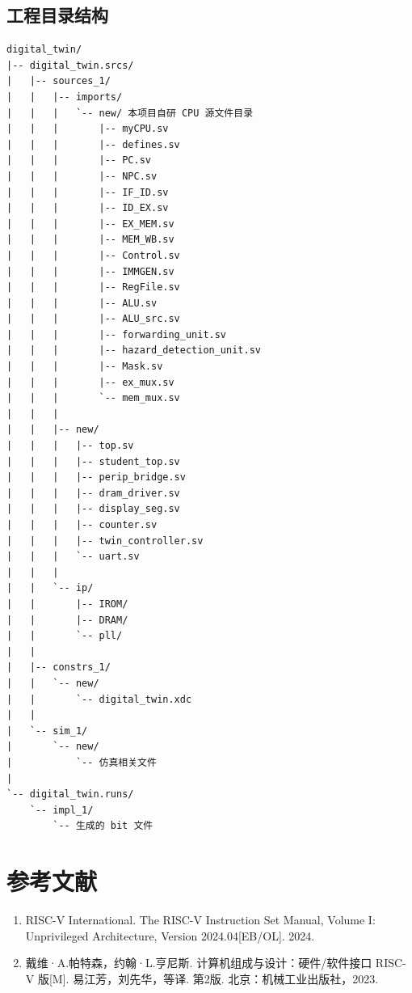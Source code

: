 \documentclass[UTF8,a4paper,12pt]{ctexart}
\begin{document}
\subsection{工程目录结构}

\begin{verbatim}
digital_twin/
|-- digital_twin.srcs/
|   |-- sources_1/
|   |   |-- imports/
|   |   |   `-- new/ 本项目自研 CPU 源文件目录
|   |   |       |-- myCPU.sv
|   |   |       |-- defines.sv
|   |   |       |-- PC.sv
|   |   |       |-- NPC.sv
|   |   |       |-- IF_ID.sv
|   |   |       |-- ID_EX.sv
|   |   |       |-- EX_MEM.sv
|   |   |       |-- MEM_WB.sv
|   |   |       |-- Control.sv
|   |   |       |-- IMMGEN.sv
|   |   |       |-- RegFile.sv
|   |   |       |-- ALU.sv
|   |   |       |-- ALU_src.sv
|   |   |       |-- forwarding_unit.sv
|   |   |       |-- hazard_detection_unit.sv
|   |   |       |-- Mask.sv
|   |   |       |-- ex_mux.sv
|   |   |       `-- mem_mux.sv
|   |   |
|   |   |-- new/
|   |   |   |-- top.sv
|   |   |   |-- student_top.sv
|   |   |   |-- perip_bridge.sv
|   |   |   |-- dram_driver.sv
|   |   |   |-- display_seg.sv
|   |   |   |-- counter.sv
|   |   |   |-- twin_controller.sv
|   |   |   `-- uart.sv
|   |   |
|   |   `-- ip/
|   |       |-- IROM/
|   |       |-- DRAM/
|   |       `-- pll/
|   |
|   |-- constrs_1/
|   |   `-- new/
|   |       `-- digital_twin.xdc
|   |
|   `-- sim_1/
|       `-- new/
|           `-- 仿真相关文件
|
`-- digital_twin.runs/
    `-- impl_1/
        `-- 生成的 bit 文件
\end{verbatim}


\clearpage
\section*{参考文献}

\begin{enumerate}
    \item RISC-V International. The RISC-V Instruction Set Manual, Volume I: Unprivileged Architecture, Version 2024.04[EB/OL]. 2024.

    \item 戴维·A.帕特森，约翰·L.亨尼斯. 计算机组成与设计：硬件/软件接口 RISC-V 版[M]. 易江芳，刘先华，等译. 第2版. 北京：机械工业出版社，2023.
\end{enumerate}
\end{document}
